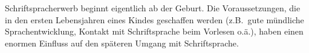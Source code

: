 Schriftspracherwerb beginnt eigentlich ab der Geburt.
Die Voraussetzungen, die in den ersten Lebensjahren eines Kindes geschaffen werden (z.B.\ gute mündliche Sprachentwicklung, Kontakt mit Schriftsprache beim Vorlesen o.ä.), haben einen enormen Einfluss auf den späteren Umgang mit Schriftsprache.